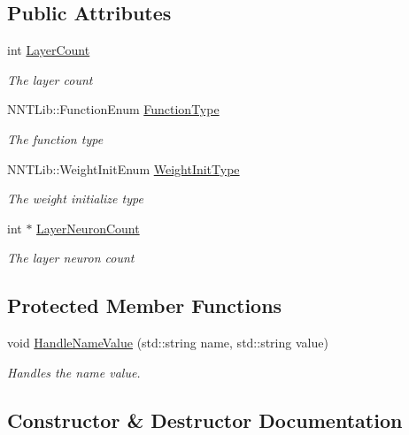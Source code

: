 \subsection*{Public Attributes}
\begin{DoxyCompactItemize}
\item 
int \hyperlink{class_neural_network_config_a1bbbe016a258c2ac3fb52e1e4873ca38}{Layer\+Count}
\begin{DoxyCompactList}\small\item\em The layer count \end{DoxyCompactList}\item 
N\+N\+T\+Lib\+::\+Function\+Enum \hyperlink{class_neural_network_config_a41262125abc80afb0e32470468a7afb0}{Function\+Type}
\begin{DoxyCompactList}\small\item\em The function type \end{DoxyCompactList}\item 
N\+N\+T\+Lib\+::\+Weight\+Init\+Enum \hyperlink{class_neural_network_config_ac387c49af177bd1c2d122fdab2250ea3}{Weight\+Init\+Type}
\begin{DoxyCompactList}\small\item\em The weight initialize type \end{DoxyCompactList}\item 
int $\ast$ \hyperlink{class_neural_network_config_a86a494523f269a122a439144c9e6cb89}{Layer\+Neuron\+Count}
\begin{DoxyCompactList}\small\item\em The layer neuron count \end{DoxyCompactList}\end{DoxyCompactItemize}
\subsection*{Protected Member Functions}
\begin{DoxyCompactItemize}
\item 
void \hyperlink{class_neural_network_config_ac913258430c16d29912c2882c8350bcd}{Handle\+Name\+Value} (std\+::string name, std\+::string value)
\begin{DoxyCompactList}\small\item\em Handles the name value. \end{DoxyCompactList}\end{DoxyCompactItemize}


\subsection{Constructor \& Destructor Documentation}
\hypertarget{class_neural_network_config_aac0a64831aa0011542cd0da2621b3e38}{}
